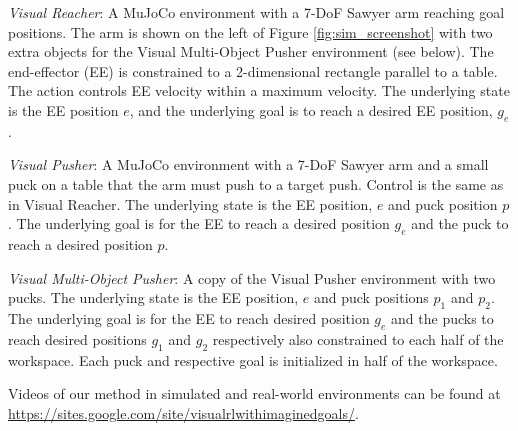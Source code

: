 \textit{Visual Reacher}: A MuJoCo environment with a 7-DoF Sawyer arm reaching goal positions.
The arm is shown on the left of Figure \ref{fig:sim_screenshot} with two extra objects for the Visual Multi-Object Pusher environment (see below).
The end-effector (EE) is constrained to a 2-dimensional rectangle parallel to a table. 
The action controls EE velocity within a maximum velocity. 
The underlying state is the EE position $e$, and the underlying goal is to reach a desired EE position, $g_e$. 

\textit{Visual Pusher}: A MuJoCo environment with a 7-DoF Sawyer arm and a small puck on a table that the arm must push to a target push.
Control is the same as in Visual Reacher.
The underlying state is the EE position, $e$ and puck position $p$.
The underlying goal is for the EE to reach a desired position $g_e$ and the puck to reach a desired position $p$. 

\textit{Visual Multi-Object Pusher}: A copy of the Visual Pusher environment with two pucks.
The underlying state is the EE position, $e$ and puck positions $p_1$ and $p_2$.
The underlying goal is for the EE to reach desired position $g_e$ and the pucks to reach desired positions $g_1$ and $g_2$ respectively also constrained to each half of the workspace.
Each puck and respective goal is initialized in half of the workspace.

Videos of our method in simulated and real-world environments can be found at \url{https://sites.google.com/site/visualrlwithimaginedgoals/}.